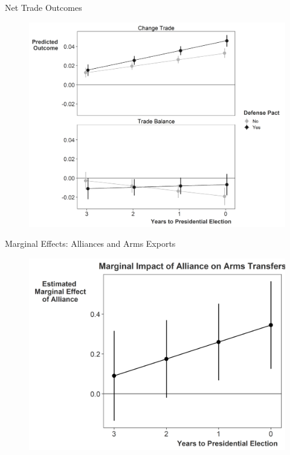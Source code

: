 \documentclass[12pt]{beamer}
\begin{document}

\begin{frame}{Net Trade Outcomes}

\begin{figure}[htbp]
	\centering
		\includegraphics[height=.90\textheight]{us-elec-pred-net.png}
\end{figure}


\end{frame}




\begin{frame}{Marginal Effects: Alliances and Arms Exports}

\begin{figure}[htbp]
	\centering
		\includegraphics[height=.90\textheight]{us-defense-me-arms.png}
\end{figure}


\end{frame}
\end{document}
